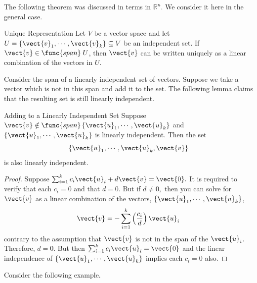 The following theorem was discussed in terms in $\mathbb{R}^n$. We consider it here in the general case.

\begin{theorem}{Unique Representation}\label{thm:uniquerepresentation}
Let $V$ be a vector space and let $U = \left\{ \vect{v}_1, \cdots, \vect{v}_k \right\} \subseteq V$ be an independent set. If $\vect{v} \in \func{span} \;U$, then $\vect{v}$ can be written uniquely as a linear combination of the vectors in $U$. 
\end{theorem}

Consider the span of a linearly independent set of vectors. Suppose we take a vector which is not in this span and add it to the set. The following lemma claims that the resulting set is still linearly independent. 

\begin{lemma}{Adding to a Linearly Independent Set}\label{lem:addinglinearlyindependent}
Suppose $\vect{v}\notin \func{span}\left\{ \vect{u}_{1},\cdots ,\vect{u}_{k}\right\} $ and $\left\{ \vect{u}_{1},\cdots ,
\vect{u}_{k}\right\} $ is linearly independent. Then the set
\begin{equation*}
\left\{ \vect{u}_{1},\cdots ,\vect{u}_{k},\vect{v} \right\}
\end{equation*}
is also linearly independent.
\end{lemma}

\begin{proof}
Suppose $\sum_{i=1}^{k}c_{i}\vect{u}_{i}+d\vect{v}=
\vect{0}.$ It is required to verify that each $c_{i}=0$ and that $d=0.$
But if $d\neq 0,$ then you can solve for $\vect{v}$ as a linear
combination of the vectors, $\left\{ \vect{u}_{1},\cdots ,\vect{u}
_{k}\right\} $, 
\begin{equation*}
\vect{v}=-\sum_{i=1}^{k}\left( \frac{c_{i}}{d}\right) \vect{u}_{i}
\end{equation*}
contrary to the assumption that $\vect{v}$ is not in the span of the $\vect{u}_{i}$. Therefore, $d=0.$ But then $\sum_{i=1}^{k}c_{i}
\vect{u}_{i}=\vect{0}$ and the linear independence of $\left\{ \vect{u}
_{1},\cdots ,\vect{u}_{k}\right\} $ implies each $c_{i}=0$ also. 
\end{proof}

Consider the following example.

